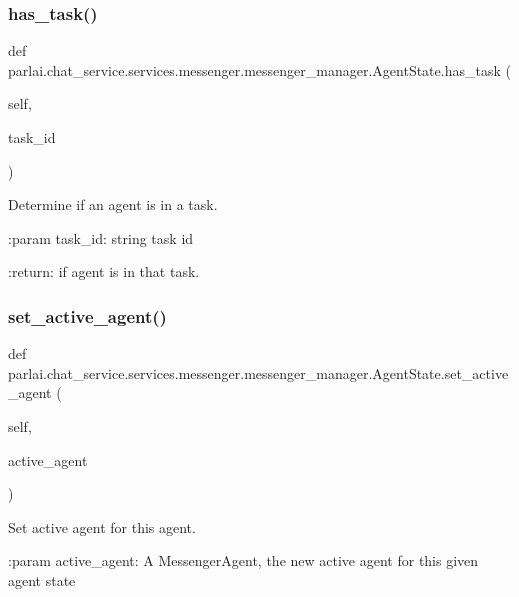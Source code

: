 \subsubsection{\texorpdfstring{has\+\_\+task()}{has\_task()}}
{\footnotesize\ttfamily def parlai.\+chat\+\_\+service.\+services.\+messenger.\+messenger\+\_\+manager.\+Agent\+State.\+has\+\_\+task (\begin{DoxyParamCaption}\item[{}]{self,  }\item[{}]{task\+\_\+id }\end{DoxyParamCaption})}

\begin{DoxyVerb}Determine if an agent is in a task.

:param task_id:
    string task id

:return:
    if agent is in that task.
\end{DoxyVerb}
 \mbox{\label{classparlai_1_1chat__service_1_1services_1_1messenger_1_1messenger__manager_1_1AgentState_a33f7fbb94a33fb890c3dcc2b8d38f740}} 
\subsubsection{\texorpdfstring{set\+\_\+active\+\_\+agent()}{set\_active\_agent()}}
{\footnotesize\ttfamily def parlai.\+chat\+\_\+service.\+services.\+messenger.\+messenger\+\_\+manager.\+Agent\+State.\+set\+\_\+active\+\_\+agent (\begin{DoxyParamCaption}\item[{}]{self,  }\item[{}]{active\+\_\+agent }\end{DoxyParamCaption})}

\begin{DoxyVerb}Set active agent for this agent.

:param active_agent:
    A MessengerAgent, the new active agent for this given agent state
\end{DoxyVerb}
 

